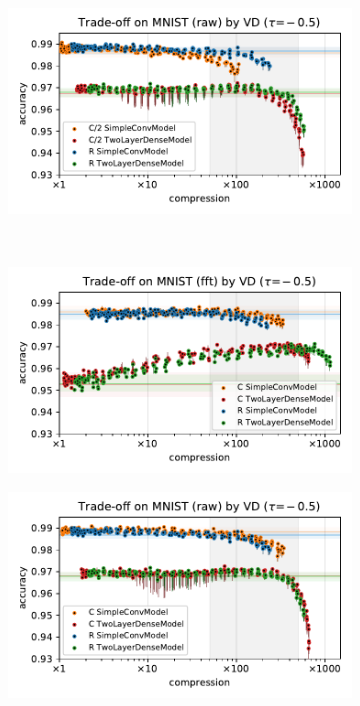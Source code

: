 \documentclass[a4paper,10pt,onecolumn]{article}
\begin{document}
\begin{figure}[b]
\begin{subfigure}[b]{0.5\columnwidth}
  \end{subfigure}%
  \begin{subfigure}[b]{0.5\columnwidth}
    \centering
    \includegraphics[width=\columnwidth]{figure__mnist-like__trade-off/appendix__cmp__VD__mnist__raw__-0.5.pdf}
  \end{subfigure} \\ %
  \begin{subfigure}[b]{0.5\columnwidth}
    \centering
    \includegraphics[width=\columnwidth]{figure__mnist-like__trade-off/appendix__VD__mnist__fft__-0.5.pdf}
  \end{subfigure}%
  \begin{subfigure}[b]{0.5\columnwidth}
    \centering
    \includegraphics[width=\columnwidth]{figure__mnist-like__trade-off/appendix__VD__mnist__raw__-0.5.pdf}

\end{subfigure}
\end{figure}
\end{document}

